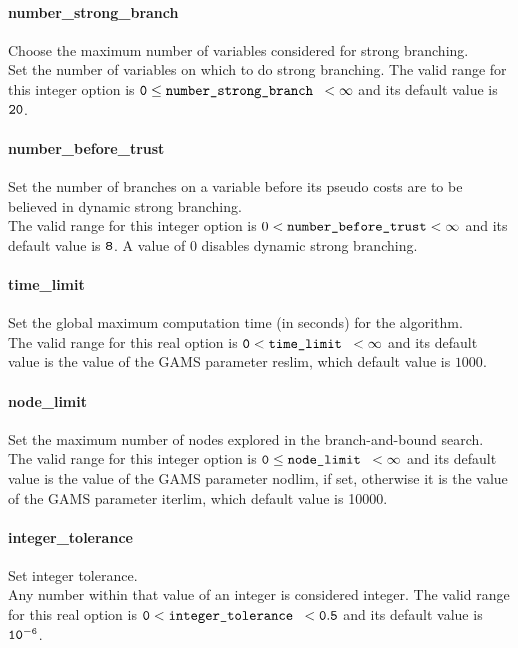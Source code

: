 \paragraph{number\_strong\_branch}
Choose the maximum number of variables considered for strong branching. \\
 Set the number of variables on which to do strong
branching. The valid range for this integer option is
${\tt 0} \le \hbox{\tt number\_strong\_branch } <  \infty$
and its default value is ${\tt 20}$.

\paragraph{number\_before\_trust}
Set the number of branches on a variable before its pseudo costs are to be believed in dynamic strong branching.\\
The valid range for this integer option is
$0<\hbox{\tt number\_before\_trust}<\infty$
and its default value is ${\tt 8}$.
A value of 0 disables dynamic strong branching.

\paragraph{time\_limit}
Set the global maximum computation time (in seconds) for the algorithm.\\
 The valid range for this real option is
${\tt 0} <  \hbox{\tt time\_limit } <  \infty$
and its default value is the value of the GAMS parameter reslim, which default value is $1000$.


\paragraph{node\_limit}
Set the maximum number of nodes explored in the branch-and-bound search.\\
The valid range for this integer option is
${\tt 0} \le \hbox{\tt node\_limit } <  \infty$
and its default value is the value of the GAMS parameter nodlim, if set, otherwise it is the value of the GAMS parameter iterlim, which default value is 10000.


\paragraph{integer\_tolerance}
Set integer tolerance.\\
 Any number within that value of an integer is considered integer.
The valid range for this real option is
${\tt 0} <  \hbox{\tt integer\_tolerance } <  {\tt 0.5}$
and its default value is ${\tt 10^{-6}}$.

